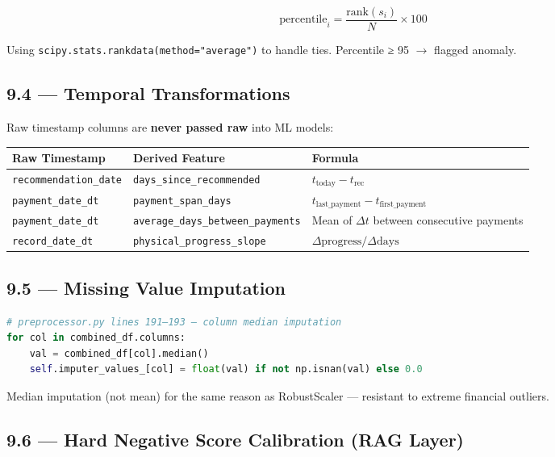 \documentclass[11pt,a4paper]{article}
\begin{document}
\[ \text{percentile}_i = \frac{\text{rank}(s_i)}{N} \times 100 \]

Using \texttt{scipy.stats.rankdata(method="average")} to handle ties. Percentile ≥ 95 $\rightarrow$ flagged anomaly.

\subsection{9.4 --- Temporal Transformations}

Raw timestamp columns are \textbf{never passed raw} into ML models:

\begin{table}[htbp]
\centering
\small
\begin{tabularx}{\textwidth}{l l Y}
\toprule
\textbf{Raw Timestamp} & \textbf{Derived Feature} & \textbf{Formula} \\
\midrule
\texttt{recommendation\_date} & \texttt{days\_since\_recommended} & $t_\text{today} - t_\text{rec}$ \\
\texttt{payment\_date\_dt} & \texttt{payment\_span\_days} & $t_\text{last\_payment} - t_\text{first\_payment}$ \\
\texttt{payment\_date\_dt} & \texttt{average\_days\_between\_payments} & Mean of $\Delta t$ between consecutive payments \\
\texttt{record\_date\_dt} & \texttt{physical\_progress\_slope} & $\Delta\text{progress} / \Delta\text{days}$ \\
\bottomrule
\end{tabularx}
\end{table}


\subsection{9.5 --- Missing Value Imputation}

\begin{lstlisting}[language=Python]
# preprocessor.py lines 191–193 — column median imputation
for col in combined_df.columns:
    val = combined_df[col].median()
    self.imputer_values_[col] = float(val) if not np.isnan(val) else 0.0
\end{lstlisting}


Median imputation (not mean) for the same reason as RobustScaler --- resistant to extreme financial outliers.

\subsection{9.6 --- Hard Negative Score Calibration (RAG Layer)}
\end{document}
